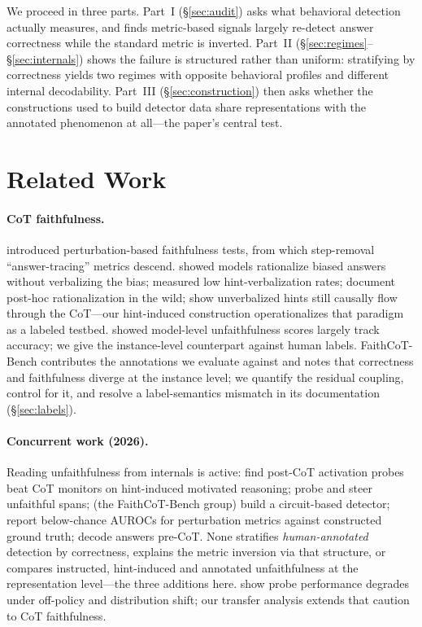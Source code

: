 \documentclass[11pt]{article}
\begin{document}
We proceed in three parts. Part~I (\S\ref{sec:audit}) asks what behavioral detection actually measures, and finds metric-based signals largely re-detect answer correctness while the standard metric is inverted. Part~II (\S\ref{sec:regimes}--\S\ref{sec:internals}) shows the failure is structured rather than uniform: stratifying by correctness yields two regimes with opposite behavioral profiles and different internal decodability. Part~III (\S\ref{sec:construction}) then asks whether the constructions used to build detector data share representations with the annotated phenomenon at all---the paper's central test.

\section{Related Work}
\label{sec:related}

\paragraph{CoT faithfulness.} \citet{lanham2023measuring} introduced perturbation-based faithfulness tests, from which step-removal ``answer-tracing'' metrics descend. \citet{turpin2023language} showed models rationalize biased answers without verbalizing the bias; \citet{chen2025reasoning} measured low hint-verbalization rates; \citet{arcuschin2025wild} document post-hoc rationalization in the wild; \citet{zaman2026hint} show unverbalized hints still causally flow through the CoT---our hint-induced construction operationalizes that paradigm as a labeled testbed. \citet{bentham2024disguised} showed model-level unfaithfulness scores largely track accuracy; we give the instance-level counterpart against human labels. FaithCoT-Bench \citep{shen2026faithcot} contributes the annotations we evaluate against and notes that correctness and faithfulness diverge at the instance level; we quantify the residual coupling, control for it, and resolve a label-semantics mismatch in its documentation (\S\ref{sec:labels}).

\paragraph{Concurrent work (2026).} Reading unfaithfulness from internals is active: \citet{mirtaheri2026catching} find post-CoT activation probes beat CoT monitors on hint-induced motivated reasoning; \citet{occhipinti2026probing} probe and steer unfaithful spans; \citet{shen2026cie} (the FaithCoT-Bench group) build a circuit-based detector; \citet{gurarieh2026bonafide} report below-chance AUROCs for perturbation metrics against constructed ground truth; \citet{cox2026decoding} decode answers pre-CoT. None stratifies \emph{human-annotated} detection by correctness, explains the metric inversion via that structure, or compares instructed, hint-induced and annotated unfaithfulness at the representation level---the three additions here. \citet{offpolicy2025probes} show probe performance degrades under off-policy and distribution shift; our transfer analysis extends that caution to CoT faithfulness.
\end{document}
